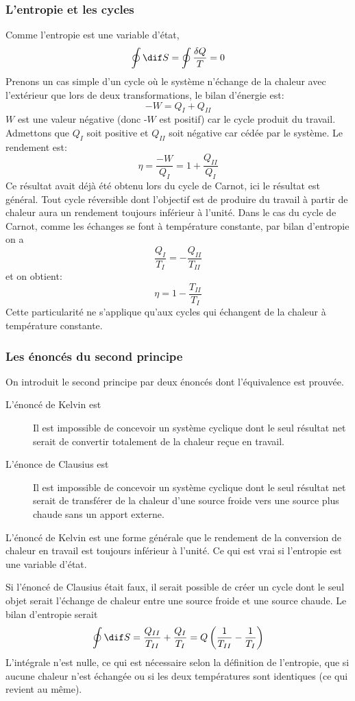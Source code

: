 \subsubsection{L'entropie et les cycles}
Comme l'entropie est une variable d'état,
\[ \oint \dif S = \oint \frac{\delta Q}{T} = 0 \]
Prenons un cas simple d'un cycle où le système n'échange de la chaleur
avec l'extérieur que lors de deux transformations, le bilan d'énergie est:
\[ -W = Q_I+Q_{II} \]
$W$ est une valeur négative (donc -$W$ est positif)
car le cycle produit du travail.
Admettons que $Q_I$ soit positive et $Q_{II}$
soit négative car cédée par le système.
Le rendement est:
\[  \eta = \frac{-W}{Q_I} = 1+\frac{Q_{II}}{Q_I} \]
Ce résultat avait déjà été obtenu lors du cycle de Carnot,
ici le résultat est général.
Tout cycle réversible dont l'objectif est de produire du travail
à partir de chaleur aura un rendement toujours inférieur à l'unité.
Dans le cas du cycle de Carnot, comme les échanges se font
à température constante, par bilan d'entropie on a
\[ \frac{Q_I}{T_I} = - \frac{Q_{II}}{T_{II}} \]
et on obtient:
\[ \eta = 1 - \frac {T_{II}}{T_I} \]
Cette particularité ne s'applique qu'aux cycles qui
échangent de la chaleur à température constante.

\subsubsection{Les énoncés du second principe}
On introduit le second principe par deux énoncés dont l'équivalence est prouvée.

\begin{description}
  \item[L'énoncé de Kelvin est]
    Il est impossible de concevoir un système cyclique dont le seul résultat net
    serait de convertir totalement de la chaleur reçue en travail.
  \item[L'énonce de Clausius est]
    Il est impossible de concevoir un système cyclique dont
    le seul résultat net serait de transférer de la chaleur
    d'une source froide vers une source plus chaude sans un apport externe.
\end{description}
L'énoncé de Kelvin est une forme générale que le rendement de la conversion
de chaleur en travail est toujours inférieur à l'unité.
Ce qui est vrai si l'entropie est une variable d'état.

Si l'énoncé de Clausius était faux, il serait possible de créer
un cycle dont le seul objet serait l'échange de chaleur
entre une source froide et une source chaude.
Le bilan d'entropie serait
\[ \oint \dif S = \frac{Q_{II}}{T_{II}}+\frac{Q_I}{T_I} =
Q\left(\frac 1 {T_{II}} - \frac 1 {T_I}\right) \]
L'intégrale n'est nulle,
ce qui est nécessaire selon la définition de l'entropie,
que si aucune chaleur n'est échangée ou si les deux températures sont
identiques (ce qui revient au même).


